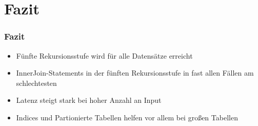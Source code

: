 \documentclass[hyperref={pdfpagelabels=false}]{beamer}
\begin{document}
\section{Fazit}
\begin{frame}
\frametitle{Fazit}
	\begin{itemize}
	\item Fünfte Rekursionsstufe wird für alle Datensätze erreicht
	\item InnerJoin-Statements in der fünften Rekursionsstufe in fast allen Fällen am schlechtesten
	\item Latenz steigt stark bei hoher Anzahl an Input
	\item Indices und Partionierte Tabellen helfen vor allem bei großen Tabellen
\end{itemize}	
\end{frame}
\end{document}
